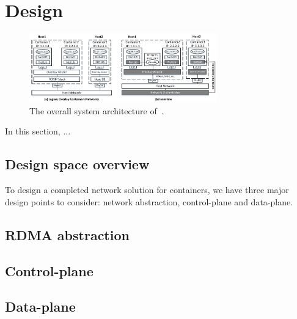 \section{Design} \label{sec:design}

\begin{figure}[t!] 
     \centering 
     \includegraphics[width=3.2in]{figures/system-arch} 
    \caption{\label{fig:sysarch} The overall system architecture of~\sysname.} 
\end{figure} 

In this section, ...

\subsection{Design space overview}

To design a completed network solution for containers, we have three 
major design points to consider: network abstraction, control-plane and
data-plane.





\subsection{RDMA abstraction}

\subsection{Control-plane}

\subsection{Data-plane}




